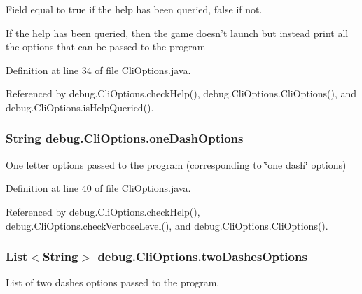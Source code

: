 Field equal to true if the help has been queried, false if not. 

If the help has been queried, then the game doesn't launch but instead print all the options that can be passed to the program 

Definition at line 34 of file Cli\-Options.\-java.



Referenced by debug.\-Cli\-Options.\-check\-Help(), debug.\-Cli\-Options.\-Cli\-Options(), and debug.\-Cli\-Options.\-is\-Help\-Queried().

\hypertarget{classdebug_1_1_cli_options_af118f8dc0f511ad69a7d3889d207a6f3}{
\subsubsection[{one\-Dash\-Options}]{\setlength{\rightskip}{0pt plus 5cm}String debug.\-Cli\-Options.\-one\-Dash\-Options\hspace{0.3cm}{\ttfamily [protected]}}}\label{classdebug_1_1_cli_options_af118f8dc0f511ad69a7d3889d207a6f3}


One letter options passed to the program (corresponding to \char`\"{}one dash\char`\"{} options) 



Definition at line 40 of file Cli\-Options.\-java.



Referenced by debug.\-Cli\-Options.\-check\-Help(), debug.\-Cli\-Options.\-check\-Verbose\-Level(), and debug.\-Cli\-Options.\-Cli\-Options().

\hypertarget{classdebug_1_1_cli_options_af52ecd6d0cb0cafd69f80f311e7d77d4}{
\subsubsection[{two\-Dashes\-Options}]{\setlength{\rightskip}{0pt plus 5cm}List$<$String$>$ debug.\-Cli\-Options.\-two\-Dashes\-Options\hspace{0.3cm}{\ttfamily [protected]}}}\label{classdebug_1_1_cli_options_af52ecd6d0cb0cafd69f80f311e7d77d4}


List of two dashes options passed to the program. 



